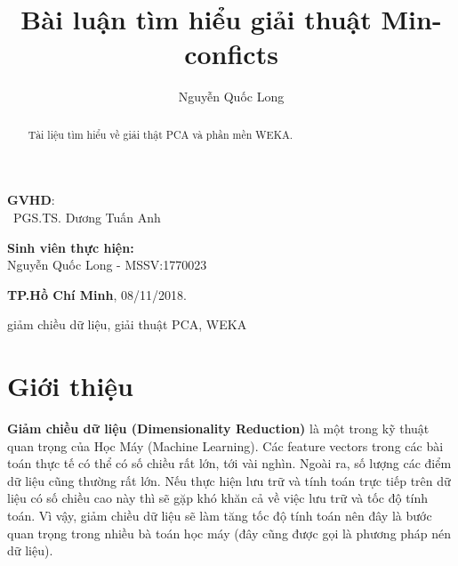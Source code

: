 \documentclass{hcmutarticle}
\begin{document}
\vspace{2cm}

\begin{minipage}[t]{0.60\linewidth}
\textbf{GVHD}: \\
\ PGS.TS. Dương Tuấn Anh
\end{minipage}
\begin{minipage}[t]{0.40\linewidth}
\textbf{Sinh viên thực hiện:}\\
Nguyễn Quốc Long - MSSV:1770023
\end{minipage}

\vspace{4cm}

\begin{center}

\textbf{TP.Hồ Chí Minh},
08/11/2018.

\end{center}



\newpage

\tableofcontents 

\newpage

\title{Bài luận tìm hiểu giải thuật Min-conficts}

\author{  Nguyễn Quốc Long} 





\maketitle



\begin{abstract}
Tài liệu tìm hiểu về giải thật PCA và phần mền WEKA.


\end{abstract}

\begin{keywords}
giảm chiều dữ liệu, giải thuật PCA, WEKA
\end{keywords} 


\section{Giới thiệu}

\textbf{Giảm chiều dữ liệu (Dimensionality Reduction)} 
 là một trong kỹ thuật quan trọng của Học Máy (Machine Learning). Các feature vectors trong các bài toán thực tế có thể có số chiều rất lớn, tới vài nghìn. Ngoài ra, số lượng các điểm dữ liệu cũng thường rất lớn. Nếu thực hiện lưu trữ và tính toán trực tiếp trên dữ liệu có số chiều cao này thì sẽ gặp khó khăn cả về việc lưu trữ và tốc độ tính toán. Vì vậy, giảm chiều dữ liệu sẽ làm tăng tốc độ tính toán nên đây là bước quan trọng trong nhiều bà toán học máy (đây cũng được gọi là phương pháp nén dữ liệu).
 
\end{document}
